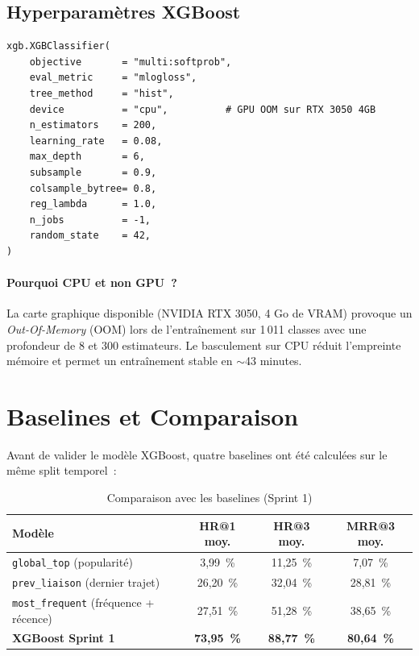 \documentclass[12pt, a4paper]{report}
\begin{document}
\subsection{Hyperparamètres XGBoost}

\begin{lstlisting}[style=python, caption={Hyperparam\`etres du classifieur XGBoost}]
xgb.XGBClassifier(
    objective       = "multi:softprob",
    eval_metric     = "mlogloss",
    tree_method     = "hist",
    device          = "cpu",          # GPU OOM sur RTX 3050 4GB
    n_estimators    = 200,
    learning_rate   = 0.08,
    max_depth       = 6,
    subsample       = 0.9,
    colsample_bytree= 0.8,
    reg_lambda      = 1.0,
    n_jobs          = -1,
    random_state    = 42,
)
\end{lstlisting}

\paragraph{Pourquoi CPU et non GPU~?}
La carte graphique disponible (NVIDIA RTX 3050, 4 Go de VRAM) provoque un
\textit{Out-Of-Memory} (OOM) lors de l'entraînement sur 1\,011 classes avec
une profondeur de 8 et 300 estimateurs. Le basculement sur CPU réduit
l'empreinte mémoire et permet un entraînement stable en $\sim$43 minutes.

\section{Baselines et Comparaison}

Avant de valider le modèle XGBoost, quatre baselines ont été calculées sur
le même split temporel~:

\begin{table}[H]
\centering
\caption{Comparaison avec les baselines (Sprint 1)}
\label{tab:baselines-s1}
\begin{tabular}{|l|c|c|c|}
\hline
\textbf{Modèle} & \textbf{HR@1 moy.} & \textbf{HR@3 moy.} & \textbf{MRR@3 moy.} \\
\hline
\texttt{global\_top} (popularité) & 3{,}99~\% & 11{,}25~\% & 7{,}07~\% \\
\hline
\texttt{prev\_liaison} (dernier trajet) & 26{,}20~\% & 32{,}04~\% & 28{,}81~\% \\
\hline
\texttt{most\_frequent} (fréquence + récence) & 27{,}51~\% & 51{,}28~\% & 38{,}65~\% \\
\hline
\textbf{XGBoost Sprint 1} & \textbf{73{,}95~\%} & \textbf{88{,}77~\%} & \textbf{80{,}64~\%} \\
\hline
\end{tabular}
\end{table}
\end{document}
